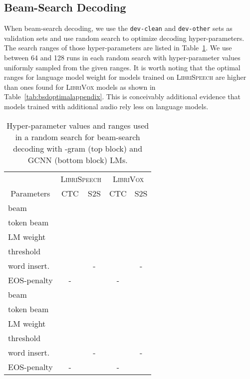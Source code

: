 \documentclass{article}
\def\devclean{\texttt{dev-clean}}
\def\devother{\texttt{dev-other}}
\newcommand{\librivox}{\textsc{LibriVox}}
\newcommand{\librispeech}{\textsc{LibriSpeech}}
\begin{document}
\subsection{Beam-Search Decoding}
When beam-search decoding, we use the \devclean{} and \devother{} sets as validation sets and use random search to optimize decoding hyper-parameters. The search ranges of those hyper-parameters are listed in Table~\ref{tab:bsdparamsappendix}. We use between 64 and 128 runs in each random search with hyper-parameter values uniformly sampled from the given ranges. It is worth noting that the optimal ranges for language model weight for models trained on \librispeech{} are higher than ones found for \librivox{} models as shown in Table~\ref{tab:bsdoptimalappendix}. This is conceivably additional evidence that models trained with additional audio rely less on language models.

\begin{table}[h!]
\caption{Hyper-parameter values and ranges used in a random search for beam-search decoding with -gram (top block) and GCNN (bottom block) LMs.\label{tab:bsdparamsappendix} }
\vskip 0.1in
\begin{center}
\begin{small}
\begin{sc}
\begin{tabular}{lcccc}
    \toprule
    & \multicolumn{2}{c}{\librispeech{}} & \multicolumn{2}{c}{\librivox{}} \\
    \multicolumn{1}{c}{Parameters} & CTC & S2S & CTC & S2S \\
    \midrule
    beam &  &  &  & \\
    token beam &  &  &  &  \\
    LM weight &  &  &  &  \\
    threshold &  &  &  &  \\
    word insert. &  & - &  & - \\
    EOS-penalty & - &  & - &  \\
    \midrule
    beam &  &  &  & \\
    token beam &  &  &  &  \\
    LM weight &  &  &  & \\
    threshold &  &  &  &   \\
    word insert. &  & - &  & - \\
    EOS-penalty & - &  & - &  \\
    \bottomrule
    \end{tabular}\end{sc}
\end{small}
\end{center}
\vskip -0.1in
\end{table}
\end{document}
